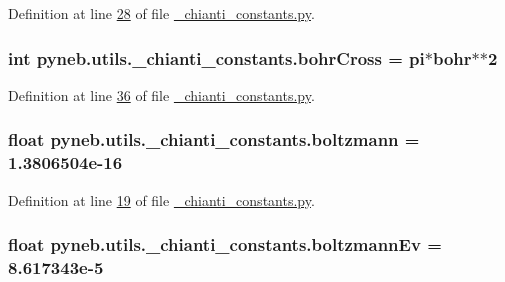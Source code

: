 Definition at line \hyperlink{__chianti__constants_8py_source_l00028}{28} of file \hyperlink{__chianti__constants_8py_source}{\+\_\+chianti\+\_\+constants.\+py}.

\hypertarget{namespacepyneb_1_1utils_1_1__chianti__constants_ae93f86759a381070e7ceffd8a9522dfe}{}
\subsubsection[{bohr\+Cross}]{\setlength{\rightskip}{0pt plus 5cm}int pyneb.\+utils.\+\_\+chianti\+\_\+constants.\+bohr\+Cross = {\bf pi}$\ast${\bf bohr}$\ast$$\ast$2}\label{namespacepyneb_1_1utils_1_1__chianti__constants_ae93f86759a381070e7ceffd8a9522dfe}


Definition at line \hyperlink{__chianti__constants_8py_source_l00036}{36} of file \hyperlink{__chianti__constants_8py_source}{\+\_\+chianti\+\_\+constants.\+py}.

\hypertarget{namespacepyneb_1_1utils_1_1__chianti__constants_a6ff0fc21098c2ae57403ff849add9d25}{}
\subsubsection[{boltzmann}]{\setlength{\rightskip}{0pt plus 5cm}float pyneb.\+utils.\+\_\+chianti\+\_\+constants.\+boltzmann = 1.\+3806504e-\/16}\label{namespacepyneb_1_1utils_1_1__chianti__constants_a6ff0fc21098c2ae57403ff849add9d25}


Definition at line \hyperlink{__chianti__constants_8py_source_l00019}{19} of file \hyperlink{__chianti__constants_8py_source}{\+\_\+chianti\+\_\+constants.\+py}.

\hypertarget{namespacepyneb_1_1utils_1_1__chianti__constants_af362f939017652aca9c7101b749e1e41}{}
\subsubsection[{boltzmann\+Ev}]{\setlength{\rightskip}{0pt plus 5cm}float pyneb.\+utils.\+\_\+chianti\+\_\+constants.\+boltzmann\+Ev = 8.\+617343e-\/5}\label{namespacepyneb_1_1utils_1_1__chianti__constants_af362f939017652aca9c7101b749e1e41}


